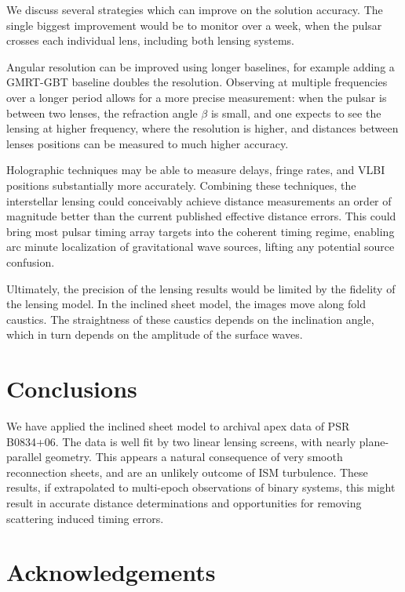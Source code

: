 \documentclass[useAMS,usenatbib]{mn2e}
\begin{document}
We discuss several strategies which can improve on the solution
accuracy.  The single biggest improvement would be to monitor over a
week, when the pulsar crosses each individual lens, including both
lensing systems.

Angular resolution can be improved using longer baselines, for example
adding a GMRT-GBT baseline doubles the resolution.  Observing at
multiple frequencies over a longer period allows for a more precise
measurement: when the pulsar is between two lenses, the refraction
angle $\beta$ is small, and one expects to see the lensing at higher
frequency, where the resolution is higher, and distances between
lenses positions can be measured to much higher accuracy.

Holographic techniques \citep{2008MNRAS.388.1214W,2014MNRAS.440L..36P}
may be able to measure delays, fringe rates, and VLBI positions
substantially more accurately.  Combining these techniques, the
interstellar lensing could conceivably achieve distance measurements
an order of magnitude better than the current published effective
distance errors.  This could bring most pulsar timing array targets
into the coherent timing regime, enabling arc minute localization of
gravitational wave sources, lifting any potential source confusion.

Ultimately, the precision of the lensing results would be limited by
the fidelity of the lensing model.  In the inclined sheet model, the
images move along fold caustics.  The straightness of these caustics
depends on the inclination angle, which in turn depends on the
amplitude of the surface waves.  

\section{Conclusions}

We have applied the \citep{2014MNRAS.442.3338P} inclined
sheet model to archival apex data of PSR B0834+06.  The data is well
fit by two linear lensing screens, with nearly plane-parallel
geometry.  This appears a natural consequence of very smooth
reconnection sheets, and are an unlikely outcome of ISM turbulence.
These results, if extrapolated to multi-epoch observations of binary
systems, this might result in accurate distance determinations and
opportunities for removing scattering induced timing errors.


\section{Acknowledgements}
\end{document}
